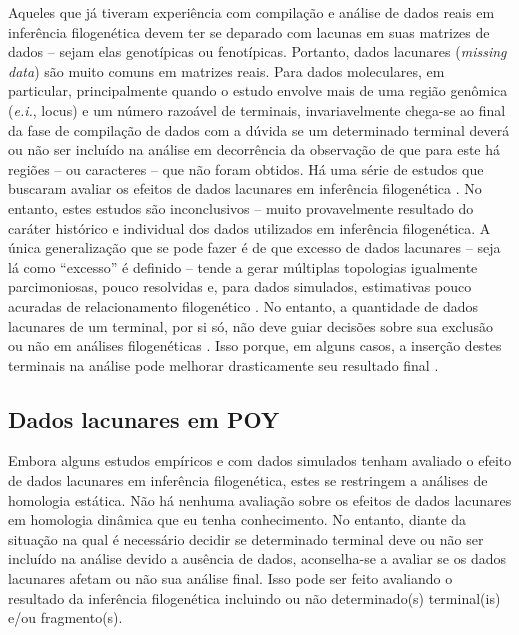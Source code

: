 \begin{refsection}
Aqueles que já tiveram experiência com compilação e análise de dados reais em inferência filogenética devem ter se deparado com lacunas em suas matrizes de dados -- sejam elas genotípicas ou fenotípicas. Portanto, dados lacunares (\textit{missing data}) são muito comuns em matrizes reais. Para dados moleculares, em particular, principalmente quando o estudo envolve mais de uma região genômica (\textit{e.i.}, locus) e um número razoável de terminais, invariavelmente chega-se ao final da fase de compilação de dados com a dúvida se um determinado terminal deverá ou não ser incluído na análise em decorrência da observação de que para este há regiões -- ou caracteres -- que não foram obtidos. Há uma série de estudos que buscaram avaliar os efeitos de dados lacunares em inferência filogenética \parencite[veja][; e referências citadas]{Weins_1998,Weins_2003,Weins_2006,Weins_and_Morrill_2011,Grievink_et_al_2013}. No entanto, estes estudos são inconclusivos -- muito provavelmente resultado do caráter histórico e individual dos dados utilizados em inferência filogenética. A única generalização que se pode fazer é de que excesso de dados lacunares -- seja lá como ``excesso'' é definido -- tende a gerar múltiplas topologias igualmente parcimoniosas, pouco resolvidas e, para dados simulados, estimativas pouco acuradas de relacionamento filogenético \parencite{Weins_2003}. No entanto, a quantidade de dados lacunares de um terminal, por si só, não deve guiar decisões sobre sua exclusão ou não em análises filogenéticas \parencite{Weins_2003}. Isso porque, em alguns casos, a inserção destes terminais na análise pode melhorar drasticamente seu resultado final \parencite{Weins_2006}.

\subsection{Dados lacunares em POY}\label{tut11:missing:poy}

Embora alguns estudos empíricos e com dados simulados tenham avaliado o efeito de dados lacunares em inferência filogenética, estes se restringem a análises de homologia estática. Não há nenhuma avaliação sobre os efeitos de dados lacunares em homologia dinâmica que eu tenha conhecimento. No entanto, diante da situação na qual é necessário decidir se determinado terminal deve ou não ser incluído na análise devido a ausência de dados, aconselha-se a avaliar se os dados lacunares afetam ou não sua análise final. Isso pode ser feito avaliando o resultado da inferência filogenética incluindo ou não determinado(s) terminal(is) e/ou fragmento(s).


\end{refsection}
